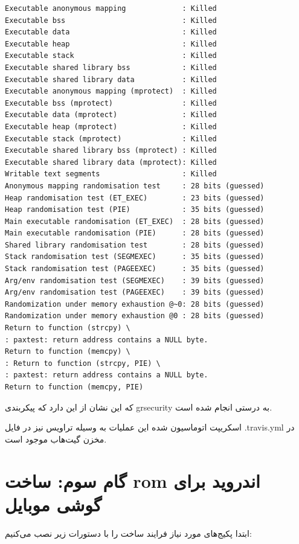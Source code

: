 \documentclass{article}
\begin{document}
\begin{enumerate}
\begin{latin}
\begin{verbatim}
Executable anonymous mapping             : Killed
Executable bss                           : Killed
Executable data                          : Killed
Executable heap                          : Killed
Executable stack                         : Killed
Executable shared library bss            : Killed
Executable shared library data           : Killed
Executable anonymous mapping (mprotect)  : Killed
Executable bss (mprotect)                : Killed
Executable data (mprotect)               : Killed
Executable heap (mprotect)               : Killed
Executable stack (mprotect)              : Killed
Executable shared library bss (mprotect) : Killed
Executable shared library data (mprotect): Killed
Writable text segments                   : Killed
Anonymous mapping randomisation test     : 28 bits (guessed)
Heap randomisation test (ET_EXEC)        : 23 bits (guessed)
Heap randomisation test (PIE)            : 35 bits (guessed)
Main executable randomisation (ET_EXEC)  : 28 bits (guessed)
Main executable randomisation (PIE)      : 28 bits (guessed)
Shared library randomisation test        : 28 bits (guessed)
Stack randomisation test (SEGMEXEC)      : 35 bits (guessed)
Stack randomisation test (PAGEEXEC)      : 35 bits (guessed)
Arg/env randomisation test (SEGMEXEC)    : 39 bits (guessed)
Arg/env randomisation test (PAGEEXEC)    : 39 bits (guessed)
Randomization under memory exhaustion @~0: 28 bits (guessed)
Randomization under memory exhaustion @0 : 28 bits (guessed)
Return to function (strcpy) \
: paxtest: return address contains a NULL byte.
Return to function (memcpy) \
: Return to function (strcpy, PIE) \
: paxtest: return address contains a NULL byte.
Return to function (memcpy, PIE)

\end{verbatim}
\end{latin}
که این نشان از این دارد که پیکربندی grsecurity به درستی انجام شده است.

\end{enumerate}

اسکریپت اتوماسیون شده این عملیات به وسیله تراویس نیز در فایل .travis.yml در مخزن گیت‌هاب موجود است.


\section*{گام سوم: ساخت rom اندروید برای گوشی موبایل\lr{Nexus 5x}}
 ابتدا پکیج‌های مورد نیاز فرایند ساخت را با دستورات زیر نصب می‌کنیم:
 
\end{document}
